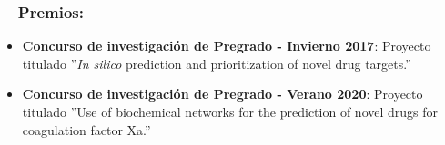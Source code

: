 \documentclass[letter,20pt]{article}
\newcommand{\resumeItem}[2]{
  \item\small{
    \textbf{#1}{: #2 \vspace{-2pt}}
  }
}
\newcommand{\resumeSubItem}[2]{\resumeItem{#1}{#2}\vspace{-3pt}}
\newcommand{\resumeSubHeadingListStart}{\begin{itemize}[leftmargin=*]}
\newcommand{\resumeSubHeadingListEnd}{\end{itemize}}
\begin{document}
\subsubsection*{~~Premios:}
\resumeSubHeadingListStart
\resumeSubItem{Concurso de investigación de Pregrado - Invierno 2017}{Proyecto titulado ''\textit{In silico} prediction and prioritization of novel drug targets.''}
	\resumeSubItem{Concurso de investigación de Pregrado - Verano 2020}{Proyecto titulado ''Use of biochemical networks for the prediction of novel drugs for coagulation factor Xa.''}
\vspace{2pt}
\resumeSubHeadingListEnd
\end{document}
